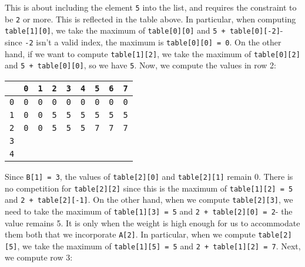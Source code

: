 \documentclass[a4paper, openany]{memoir}
\begin{document}
This is about including the element \texttt{5} into the list, and requires the constraint to be \texttt{2} or more. This is reflected in the table above. In particular, when computing \texttt{table[1][0]}, we take the maximum of \texttt{table[0][0]} and \texttt{5 + table[0][-2]}- since \texttt{-2} isn't a valid index, the maximum is \texttt{table[0][0] = 0}. On the other hand, if we want to compute \texttt{table[1][2]}, we take the maximum of \texttt{table[0][2]} and \texttt{5 + table[0][0]}, so we have \texttt{5}. Now, we compute the values in row 2:
\begin{center}
    \begin{tabular}{|c|c|c|c|c|c|c|c|c|}
        \hline
         & \texttt{0} & \texttt{1} & \texttt{2} & \texttt{3} & \texttt{4} & \texttt{5} & \texttt{6} & \texttt{7} \\
        \hline
        \texttt{0} & \texttt{0} & \texttt{0} & \texttt{0} & \texttt{0} & \texttt{0} & \texttt{0} & \texttt{0} & \texttt{0} \\
        \hline
        \texttt{1} & \texttt{0} & \texttt{0} & \texttt{5} & \texttt{5} & \texttt{5} & \texttt{5} & \texttt{5} & \texttt{5} \\
        \hline
        \texttt{2} & \texttt{0} & \texttt{0} & \texttt{5} & \texttt{5} & \texttt{5} & \texttt{7} & \texttt{7} & \texttt{7} \\
        \hline
        \texttt{3} & & & & & & & & \\
        \hline
        \texttt{4} & & & & & & & & \\
        \hline
    \end{tabular}
\end{center}
Since \texttt{B[1] = 3}, the values of \texttt{table[2][0]} and \texttt{table[2][1]} remain 0. There is no competition for \texttt{table[2][2]} since this is the maximum of \texttt{table[1][2] = 5} and \texttt{2 + table[2][-1]}. On the other hand, when we compute \texttt{table[2][3]}, we need to take the maximum of \texttt{table[1][3] = 5} and \texttt{2 + table[2][0] = 2}- the value remains 5. It is only when the weight is high enough for us to accommodate them both that we incorporate \texttt{A[2]}. In particular, when we compute \texttt{table[2][5]}, we take the maximum of \texttt{table[1][5] = 5} and \texttt{2 + table[1][2] = 7}. Next, we compute row 3:
\end{document}
